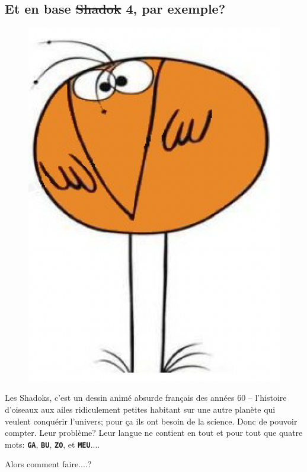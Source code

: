 \documentclass[12pt]{article}
\begin{document}
	 \pagebreak
	 \subsection{Et en base \sout{Shadok} 4, par exemple?}
	 
	\begin{figure}
		\includegraphics[scale=0.2]{001_Shadok.png}
	\end{figure}
	 Les Shadoks, c'est un dessin animé absurde français des années 60 -- l'histoire d'oiseaux aux ailes ridiculement petites habitant sur une autre planète qui veulent conquérir l'univers; pour ça ils ont besoin de la science. Donc de pouvoir compter. Leur problème? Leur langue ne contient en tout et pour tout que quatre mots: \textbf{\texttt{GA}}, \textbf{\texttt{BU}}, \textbf{\texttt{ZO}}, et \textbf{\texttt{MEU}}....
	
	 Alors comment faire....?
	 
\end{document}
